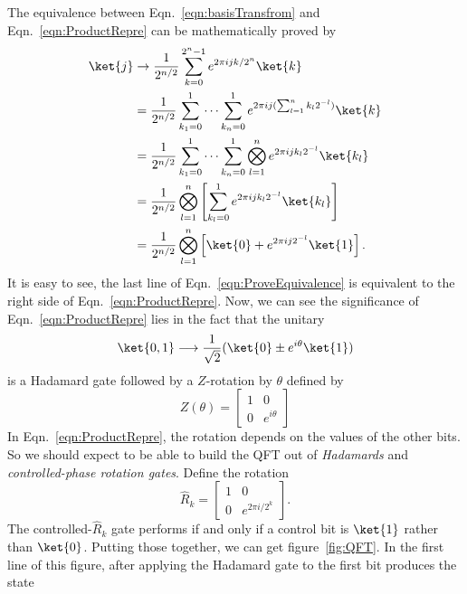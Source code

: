 The equivalence between Eqn.~\ref{eqn:basisTransfrom} and Eqn.~\ref{eqn:ProductRepre} can be mathematically proved by
\begin{equation}
    \begin{split}
        \ket{j}&\rightarrow\frac{1}{2^{n/2}}\sum_{k=0}^{2^n-1}e^{2\pi ijk/2^{n}}\ket{k}\\
        &=\frac{1}{2^{n/2}}\sum_{k_1=0}^1\cdots\sum_{k_n=0}^1e^{2\pi ij(\sum_{l=1}^nk_l2^{-l})}\ket{k}\\
        &=\frac{1}{2^{n/2}}\sum_{k_1=0}^1\cdots\sum_{k_n=0}^1\bigotimes_{l=1}^ne^{2\pi ijk_l2^{-l}}\ket{k_l}\\
        &=\frac{1}{2^{n/2}}\bigotimes_{l=1}^n\left[\sum_{k_l=0}^1e^{2\pi ijk_l2^{-l}}\ket{k_l}\right]\\
        &=\frac{1}{2^{n/2}}\bigotimes_{l=1}^n\left[\ket{0}+e^{2\pi ij2^{-l}}\ket{1}\right].
    \end{split} 
    \label{eqn:ProveEquivalence}
\end{equation}
It is easy to see, the last line of Eqn.~\ref{eqn:ProveEquivalence} is equivalent to the right side of Eqn.~\ref{eqn:ProductRepre}. Now, we can see the significance of Eqn.~\ref{eqn:ProductRepre} lies in the fact that the unitary 
\begin{equation}
    \ket{0,1}\longrightarrow\frac{1}{\sqrt{2}}(\ket{0}\pm e^{i\theta}\ket{1})
\end{equation}
is a Hadamard gate followed by a $Z$-rotation by $\theta$ defined by
\begin{equation}
    Z(\theta)=\begin{bmatrix}
        1&0\\
        0&e^{i\theta}
    \end{bmatrix}
\end{equation}
In Eqn.~\ref{eqn:ProductRepre}, the rotation depends on the values of the other bits. So we should expect to be able to build the QFT out of \textit{Hadamards} and \textit{controlled-phase rotation gates}. Define the rotation
\begin{equation}
    \hat{R}_k=\begin{bmatrix}
        1&0\\
        0&e^{2\pi i/2^k}
    \end{bmatrix}.
\end{equation}
The controlled-$\hat{R}_k$ gate performs if and only if a control bit is $\ket{1}$ rather than $\ket{0}$. Putting those together, we can get figure~\ref{fig:QFT}. In the first line of this figure, after applying the Hadamard gate to the first bit produces the state
